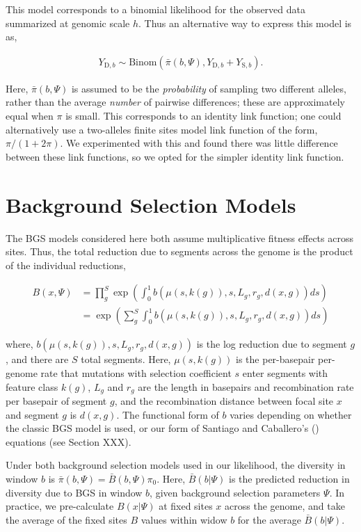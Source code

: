 \documentclass[11pt]{article}
\begin{document}
This model corresponds to a binomial likelihood for the observed data
summarized at genomic scale $h$. Thus an alternative way to express this model
is as, 

\begin{align}
  Y_{\text{D},b} \sim \text{Binom}(\bar{\pi}(b, \Psi), Y_{\text{D},b} + Y_{\text{S},b}).
\end{align}

Here, $\bar{\pi}(b, \Psi)$ is assumed to be the \emph{probability} of sampling
two different alleles, rather than the average \emph{number} of pairwise
differences; these are approximately equal when $\pi$ is small. This
corresponds to an identity link function; one could alternatively use a
two-alleles finite sites model link function of the form, $\pi/(1 + 2 \pi)$. We
experimented with this and found there was little difference between these link
functions, so we opted for the simpler identity link function.


\section{Background Selection Models}

The BGS models considered here both assume multiplicative fitness effects
across sites. Thus, the total reduction due to segments across the genome is
the product of the individual reductions, 

\begin{align}
  \label{suppeqn:b}
  B(x, \Psi) &= \prod_g^S \exp \left( \int_0^1 b(\mu(s, k(g)), s, L_g, r_g, d(x, g)) ds \right) \\
             &= \exp \left( \sum_g^S \int_0^1 b(\mu(s, k(g)), s, L_g, r_g, d(x, g)) ds \right)
\end{align}

where, $b(\mu(s, k(g)), s, L_g, r_g, d(x,g))$ is the log reduction due to
segment $g$, and there are $S$ total segments. Here, $\mu(s, k(g))$ is the
per-basepair per-genome rate that mutations with selection coefficient $s$
enter segments with feature class $k(g)$, $L_g$ and $r_g$ are the length in
basepairs and recombination rate per basepair of segment $g$, and the
recombination distance between focal site $x$ and segment $g$ is $d(x, g)$. The
functional form of $b$ varies depending on whether the classic BGS model is
used, or our form of Santiago and Caballero's (\citeyear{Santiago2016-mu})
equations (see Section XXX).

Under both background selection models used in our likelihood, the diversity in
window $b$ is $\bar{\pi}(b, \Psi) = \bar{B}(b, \Psi) \pi_0$. Here, $\bar{B}(b |
\Psi)$ is the predicted reduction in diversity due to BGS in window $b$, given
background selection parameters $\Psi$. In practice, we pre-calculate $B(x |
\Psi)$ at fixed sites $x$ across the genome, and take the average of the fixed
sites $B$ values within widow $b$ for the average $\bar{B}(b | \Psi)$. 
\end{document}
